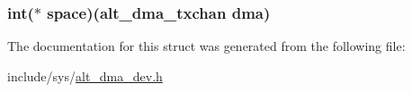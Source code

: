 \hypertarget{structalt__dma__txchan__dev__s_addde7db88a5c24bfe0c1a71987a91af8}{
\subsubsection[{space}]{\setlength{\rightskip}{0pt plus 5cm}int($\ast$ {\bf space})({\bf alt\-\_\-dma\-\_\-txchan} dma)}}\label{structalt__dma__txchan__dev__s_addde7db88a5c24bfe0c1a71987a91af8}


\-The documentation for this struct was generated from the following file\-:\begin{DoxyCompactItemize}
\item 
include/sys/\hyperlink{alt__dma__dev_8h}{alt\-\_\-dma\-\_\-dev.\-h}\end{DoxyCompactItemize}
